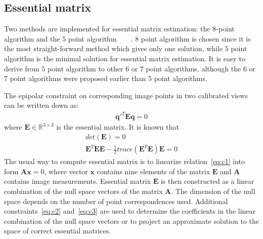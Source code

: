 \subsection{Essential matrix}
Two methods are implemented for essential matrix estimation: the $8$-point algorithm and the $5$ point algorithm~\cite{nister2003efficient}~\cite{li2006five}~\cite{triggs2000routines}~\cite{nister2004efficient}. $8$ point algorithm is chosen since it is the most straight-forward method which gives only one solution, while $5$ point algorithm is the minimal solution for essential matrix estimation. It is easy to derive from $5$ point algorithm to other $6$ or $7$ point algorithms, although the $6$ or $7$ point algorithms were proposed earlier than $5$ point algorithms.

The epipolar constraint on corresponding image points in two calibrated views can be written down as:
\begin{align}
\mathbf{q}'^T\mathbf{E}\mathbf{q}=0
\label{eq:c1}
\end{align}
where $\mathbf{E} \in \mathbb{R}^{3\times3}$ is the essential matrix. It is known that 
\begin{align}
\label{eq:c2}
det(\mathbf{E})=0 \\
\label{eq:c3}
\mathbf{E}^T\mathbf{EE}-\frac{1}{2}trace(\mathbf{E}^T\mathbf{E})\mathbf{E}=0
\end{align}
The usual way to compute essential matrix is to linearize relation~\eqref{eq:c1} into form $\mathbf{A}\mathbf{x} = 0$, where vector $\mathbf{x}$ contains nine elements of the matrix $\mathbf{E}$ and $\mathbf{A}$ contains image measurements. Essential matrix $\mathbf{E}$ is then constructed as a linear combination of the null space vectors of the matrix $\mathbf{A}$. The dimension of the null space depends on the number of point correspondences used. Additional constraints~\eqref{eq:c2} and~\eqref{eq:c3} are used to determine the coefficients
in the linear combination of the null space vectors or to project an approximate
solution to the space of correct essential matrices.

